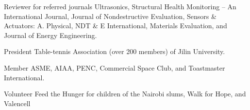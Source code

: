 

\begin{cvleadership}

  \cvskillv
    {Reviewer for referred journals} %
    {Ultrasonics, Structural Health Monitoring – An International Journal, Journal of Nondestructive Evaluation, Sensors \& Actuators: A. Physical, NDT \& E International, Materials Evaluation, and Journal of Energy Engineering.} %
   
  \cvskillv
    {President} %
    {Table-tennis Association (over 200 members) of Jilin University.} %
   
     \cvskillv
    {Member} %
    {ASME, AIAA, PENC, Commercial Space Club, and Toastmaster International.} %
   
     \cvskillv
    {Volunteer} %
    {Feed the Hunger for children of the Nairobi slums, Walk for Hope, and Valencell} %
   


\end{cvleadership}
